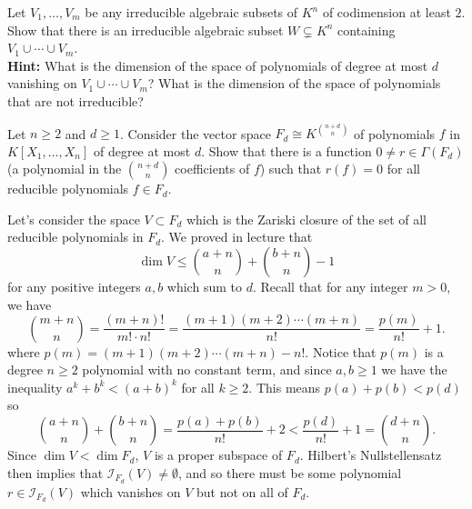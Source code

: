 \documentclass[11pt,letterpaper]{article}
\begin{document}
\begin{problem}[bonus]
    Let $V_1,\dots,V_m$ be any irreducible algebraic subsets of $K^n$ of codimension at least $2$. Show that there is an irreducible algebraic subset $W\subsetneq K^n$ containing $V_1\cup\cdots\cup V_m$.\\
    \textbf{Hint:} What is the dimension of the space of polynomials of degree at most $d$ vanishing on $V_1\cup\cdots\cup V_m$? What is the dimension of the space of polynomials that are not irreducible?
\end{problem}

\begin{problem}
    Let $n\geq2$ and $d\geq1$. Consider the vector space $F_d\cong K^{\binom{n+d}{n}}$ of polynomials $f$ in $K[X_1,\dots,X_n]$ of degree at most $d$. Show that there is a function $0\neq r\in\Gamma(F_d)$ (a polynomial in the $\binom{n+d}{n}$ coefficients of $f$) such that $r(f) = 0$ for all reducible polynomials $f\in F_d$.
\end{problem}

\begin{solution}
    Let's consider the space $V\subset F_d$ which is the Zariski closure of the set of all reducible polynomials in $F_d$. We proved in lecture that
    \[
        \dim V\leq \binom{a+n}{n}+\binom{b+n}{n}-1
    \] 
    for any positive integers $a,b$ which sum to $d$. Recall that for any integer $m>0$, we have
    \[
        \binom{m+n}{n}=\frac{(m+n)!}{m!\cdot n!}=\frac{(m+1)(m+2)\cdots(m+n)}{n!} = \frac{p(m)}{n!}+1.
    \] 
    where $p(m)=(m+1)(m+2)\cdots(m+n)-n!$. Notice that $p(m)$ is a degree $n\geq 2$ polynomial with no constant term, and since $a,b\geq 1$ we have the inequality $a^k+b^k< (a+b)^k$ for all $k\geq 2$. This means $p(a)+p(b)<p(d)$ so
    \[
        \binom{a+n}{n}+\binom{b+n}{n} = \frac{p(a)+p(b)}{n!}+2< \frac{p(d)}{n!}+1=\binom{d+n}{n}.
    \] 
    Since $\dim V < \dim F_d$, $V$ is a proper subspace of $F_d$. Hilbert's Nullstellensatz then implies that $\mathcal{I}_{F_d}(V)\neq \emptyset$, and so there must be some polynomial $r\in \mathcal{I}_{F_d}(V)$ which vanishes on $V$ but not on all of $F_d$.
\end{solution}
\end{document}
